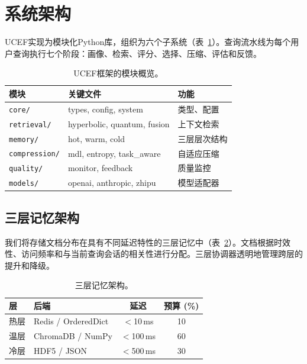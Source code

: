 \documentclass[a4paper,11pt]{ctexart}
\newcommand{\ucef}{\textsf{UCEF}}
\begin{document}
\section{系统架构}
\label{sec:architecture}

\ucef{}实现为模块化Python库，组织为六个子系统（表~\ref{tab:modules}）。查询流水线为每个用户查询执行七个阶段：画像、检索、评分、选择、压缩、评估和反馈。

\begin{table}[t]
\centering
\caption{\ucef{}框架的模块概览。}
\label{tab:modules}
\small
\begin{tabular}{@{}lll@{}}
\toprule
模块 & 关键文件 & 功能 \\
\midrule
\texttt{core/} & types, config, system & 类型、配置 \\
\texttt{retrieval/} & hyperbolic, quantum, fusion & 上下文检索 \\
\texttt{memory/} & hot, warm, cold & 三层层次结构 \\
\texttt{compression/} & mdl, entropy, task\_aware & 自适应压缩 \\
\texttt{quality/} & monitor, feedback & 质量监控 \\
\texttt{models/} & openai, anthropic, zhipu & 模型适配器 \\
\bottomrule
\end{tabular}
\end{table}

\subsection{三层记忆架构}

我们将存储文档分布在具有不同延迟特性的三层记忆中（表~\ref{tab:memory}）。文档根据时效性、访问频率和与当前查询会话的相关性进行分配。三层协调器透明地管理跨层的提升和降级。

\begin{table}[t]
\centering
\caption{三层记忆架构。}
\label{tab:memory}
\small
\begin{tabular}{@{}llcc@{}}
\toprule
层 & 后端 & 延迟 & 预算 (\%) \\
\midrule
热层   & Redis / OrderedDict & $<$10\,ms  & 10 \\
温层   & ChromaDB / NumPy    & $<$100\,ms & 60 \\
冷层   & HDF5 / JSON         & $<$500\,ms & 30 \\
\bottomrule
\end{tabular}
\end{table}
\end{document}
